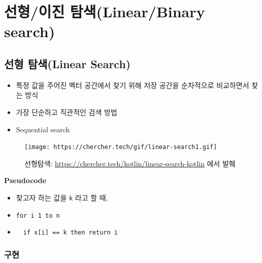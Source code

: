 \documentclass[
  11pt,
]{krantz}
\makeatletter
\providecommand{\tightlist}{%
  \setlength{\itemsep}{0pt}\setlength{\parskip}{0pt}}
\newenvironment{kframe}{%
\medskip{}
\setlength{\fboxsep}{.8em}
 \def\at@end@of@kframe{}%
 \ifinner\ifhmode%
  \def\at@end@of@kframe{\end{minipage}}%
  \begin{minipage}{\columnwidth}%
 \fi\fi%
 \def\FrameCommand##1{\hskip\@totalleftmargin \hskip-\fboxsep
 \colorbox{shadecolor}{##1}\hskip-\fboxsep
     \hskip-\linewidth \hskip-\@totalleftmargin \hskip\columnwidth}%
 \MakeFramed {\advance\hsize-\width
   \@totalleftmargin\z@ \linewidth\hsize
   \@setminipage}}%
 {\par\unskip\endMakeFramed%
 \at@end@of@kframe}
\renewenvironment{quote}{\begin{kframe}}{\end{kframe}}
\makeatother
\begin{document}
\normalsize

\hypertarget{uxc120uxd615uxc774uxc9c4-uxd0d0uxc0c9linearbinary-search}{%
\section{선형/이진 탐색(Linear/Binary search)}\label{uxc120uxd615uxc774uxc9c4-uxd0d0uxc0c9linearbinary-search}}

\hypertarget{uxc120uxd615-uxd0d0uxc0c9linear-search}{%
\subsection{선형 탐색(Linear Search)}\label{uxc120uxd615-uxd0d0uxc0c9linear-search}}

\begin{itemize}
\tightlist
\item
  특정 값을 주어진 벡터 공간에서 찾기 위해 저장 공간을 순차적으로 비교하면서 찾는 방식
\item
  가장 단순하고 직관적인 검색 방법
\item
  Sequential search
\end{itemize}

\begin{figure}
\centering
\texttt{[image: https://chercher.tech/gif/linear-search1.gif]}
\caption{선형탐색: \url{https://chercher.tech/kotlin/linear-search-kotlin} 에서 발췌}
\end{figure}

\textbf{Pseudocode}

\begin{quote}
\begin{itemize}
\tightlist
\item
  찾고자 하는 값을 \texttt{k} 라고 할 때,
\item
  \texttt{for\ i\ 1\ to\ n}
\item
  ~~\texttt{if\ x{[}i{]}\ ==\ k\ then\ return\ i}
\end{itemize}
\end{quote}

\hypertarget{uxad6cuxd604-1}{%
\subsubsection*{구현}\label{uxad6cuxd604-1}}


\footnotesize
\end{document}
